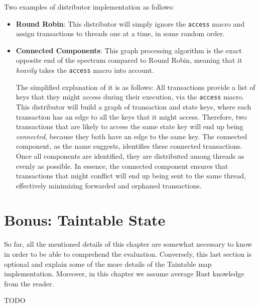 Two examples of distributor implementation as follows:

\begin{itemize}
	\item \textbf{Round Robin}: This distributor will simply ignore the \texttt{access} macro and
	assign transactions to threads one at a time, in some random order.
	\item \textbf{Connected Components}\cite{nuutilaFindingStronglyConnected1994}: This graph
	processing algorithm is the exact opposite end of the spectrum compared to Round Robin, meaning
	that it \textit{heavily} takes the \texttt{access} macro into account.

	The simplified explanation of it is as follows: All transactions provide a list of keys that
	they might access during their execution, via the \texttt{access} macro. This distributor will
	build a graph of transaction and state keys, where each transaction has an edge to all the keys
	that it might access. Therefore, two transactions that are likely to access the same state key
	will end up being \textit{connected}, because they both have an edge to the same key. The
	connected component, as the name suggests, identifies these connected transactions. Once all
	components are identified, they are distributed among threads as evenly as possible. In essence,
	the connected component ensures that transactions that might conflict will end up being sent to
	the same thread, effectively minimizing forwarded and orphaned transactions.
\end{itemize}

\section{Bonus: Taintable State}

So far, all the mentioned details of this chapter are somewhat necessary to know in order to be able
to comprehend the evaluation. Conversely, this last section is optional and explain some of the more
details of the Taintable map implementation. Moreover, in this chapter we assume average Rust
knowledge from the reader.

TODO
